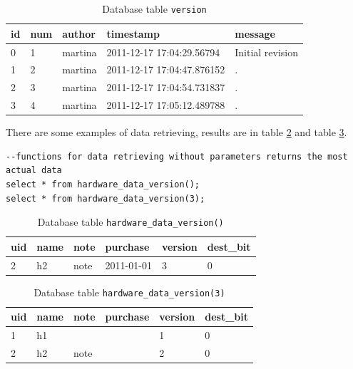 \documentclass[deska]{subfiles}
\begin{document}
\begin{longtable}{ l | l | l | l | l }
    \caption{Database table {\tt version}}\\
    id & num & author & timestamp & message\\
    \hline
    \endhead
\label{tab:example-version}
    0 & 1 & martina & 2011-12-17 17:04:29.56794 & Initial revision\\
    1 & 2 & martina & 2011-12-17 17:04:47.876152 & .\\
    2 & 3 & martina & 2011-12-17 17:04:54.731837 & .\\
    3 & 4 & martina & 2011-12-17 17:05:12.489788 & .\\
    \hline
\end{longtable}


There are some examples of data retrieving, results are in table \ref{tab:select-hardware} and table \ref{tab:select-hardware-v3}.\\

\begin{verbatim}
--functions for data retrieving without parameters returns the most actual data
select * from hardware_data_version();
select * from hardware_data_version(3);
\end{verbatim}

\begin{longtable}{ l | l | l | l | l | l }
    \caption{Database table {\tt hardware\_data\_version()}}\\
    uid & name & note & purchase & version & dest\_bit\\
    \hline
    \endhead
\label{tab:select-hardware}
    2 & h2 & note & 2011-01-01 & 3 & 0\\
    \hline
\end{longtable}

\begin{longtable}{ l | l | l | l | l | l }
    \caption{Database table {\tt hardware\_data\_version(3)}} \\
    uid & name & note & purchase & version & dest\_bit\\
    \hline
    \endhead
\label{tab:select-hardware-v3}
    1 & h1 &  &  & 1 & 0\\
    2 & h2 & note &  & 2 & 0\\
    \hline
\end{longtable}
\end{document}

